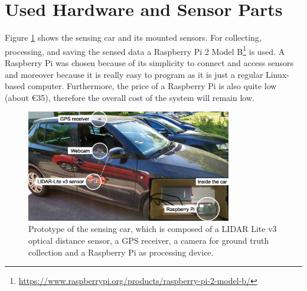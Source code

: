 %
%
%









\section{Used Hardware and Sensor Parts}
\label{sec:test_bed}

Figure \ref{fig:sensing_car} shows the sensing car and its mounted sensors. For collecting, processing, and saving the sensed data a Raspberry Pi 2 Model B\footnote{\url{https://www.raspberrypi.org/products/raspberry-pi-2-model-b/}} is used. A Raspberry Pi was chosen because of its simplicity to connect and access sensors and moreover because it is really easy to program as it is just a regular Linux-based computer. Furthermore, the price of a Raspberry Pi is also quite low (about \euro{35}), therefore the overall cost of the system will remain low.


\begin{figure}
	\centering
	\includegraphics[width=0.8\textwidth]{img/car.jpg}
	\caption{Prototype of the sensing car, which is composed of a LIDAR Lite v3 optical distance sensor, a GPS receiver, a camera for ground truth collection and a Raspberry Pi as processing device.}
	\label{fig:sensing_car}
\end{figure}


